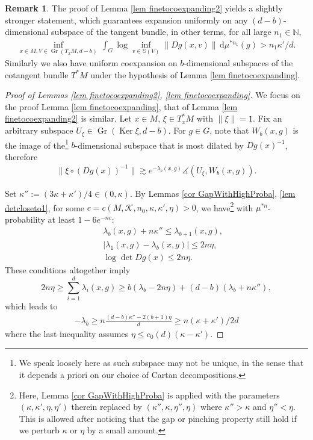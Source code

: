 \documentclass[11pt, leqno, fleqn]{amsart}
\newcommand{\margem}[1]{\marginpar{{\scriptsize {#1}}}}
\def\clo{   \color{orange}}
\def \N{{\mathbb N}}
\newcommand{\dd}{\,\mathrm{d}}
\DeclareMathOperator{\Gr}{Gr}
\newcommand{\cK}{{\mathcal K}}
\newcommand{\ary}{\begin{eqnarray}}
\newcommand{\eary}{\end{eqnarray}}
\newcommand{\aryst}{\begin{eqnarray*}}
\newcommand{\earyst}{\end{eqnarray*}}
\theoremstyle{definition}
\newtheorem{rema}[thm]{\bf Remark}
\theoremstyle{definition}
\def\S{ {\mathbb{S}} }
\DeclareMathOperator{\Ker}{Ker}
\begin{document}
\begin{rema} \label{rem-exp-extbundle}The proof of Lemma \ref{lem finetocoexpanding2} yields a slightly stronger statement, which guarantees expansion uniformly on any $(d-b)$-dimensional subspace of the tangent bundle, in other terms, for all large $n_{1}\in \N$, 
	\aryst
		 	\inf_{x\in M, V\in \Gr(T_{x}M, d-b)}\,  \int_{G} \log \inf_{v\in \S(V)}\| Dg(x,v)  \| \dd\mu^{* n_{1}}(g) > n_{1} \kappa'/d.
		 	\earyst
Similarly we also have uniform coexpansion on $b$-dimensional subspaces of the cotangent bundle $T^*M$  under the hypothesis of Lemma \ref{lem finetocoexpanding}. 
\end{rema}

 \begin{proof}[Proof of Lemmas \ref{lem finetocoexpanding2}, \ref{lem finetocoexpanding}]
We focus on the proof Lemma  \ref{lem finetocoexpanding}, that of Lemma \ref{lem finetocoexpanding2} is similar. Let $x\in M$, $\xi \in T_{x}^*M$  with $\|\xi\|=1$. Fix an arbitrary subspace $U_{\xi}\in \Gr(\Ker \xi, d-b)$. For $g\in G$, note that $W_{b}(x,g)$ is the image of the\footnote{We speak loosely here as such subspace may not be unique, in the sense that it  depends a priori on our choice of Cartan decompositions.} $b$-dimensional subspace that is most dilated by $Dg(x)^{-1}$, therefore 
\ary\label{xiDg-lb}
\|\xi \circ (Dg(x))^{-1} \| \gtrsim e^{-\lambda_{b}(x,g)} \measuredangle (U_{\xi}, W_{b}(x,g)). 
\eary

 Set $\kappa'':= (3\kappa+\kappa')/4\in (0, \kappa)$. By Lemmas \ref{cor GapWithHighProba}, \ref{lem detcloseto1}, for some  $c=c(M, \cK, n_{0}, \kappa, \kappa', \eta)>0$, we have\footnote{Here, Lemma \ref{cor GapWithHighProba} is applied with the parameters $(\kappa,\kappa', \eta, \eta')$ therein replaced by $(\kappa'',\kappa, \eta'', \eta)$ where $\kappa''>\kappa$ and $\eta''<\eta$. This is allowed after noticing that the gap or pinching property still hold if we perturb $\kappa$ or $\eta$ by a small amount.} 
 with $\mu^{*n}$-probability at least $1- 6e^{- nc}$:   
 \aryst
&& \lambda_{b}(x,g)+ n\kappa'' \leq \lambda_{b+1}(x,g), \\
&& |\lambda_{1}(x,g)-\lambda_{b}(x,g)| \leq 2n\eta, \\
&& \log \det Dg(x) \leq 2n\eta.
\earyst
These conditions altogether imply 
$$2n\eta \geq\sum_{i=1}^d \lambda_{i}(x,g) \geq b(\lambda_{b} - 2n\eta)+ (d-b)(\lambda_{b}+n\kappa''),$$
which leads to 
\ary\label{lyap-lb}
-\lambda_{b} \geq n \frac{(d-b) \kappa''  -2(b+1)\eta}{d} \geq n (\kappa+\kappa')/2d
\eary
where the last inequality assumes $\eta \leq c_{0}(d)(\kappa-\kappa')$.  


\end{proof}
\end{document}
